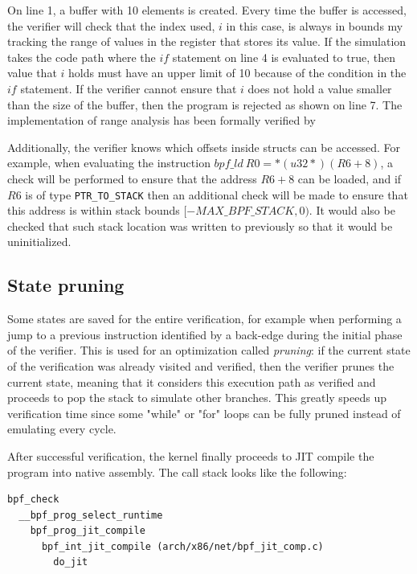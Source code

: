 On line 1, a buffer with 10 elements is created. Every time the buffer is
accessed, the verifier will check that the index used, $i$ in this case, is
always in bounds my tracking the range of values in the register that stores its
value. If the simulation takes the code path where the $if$ statement on line 4
is evaluated to true, then value that $i$ holds must have an upper limit of 10
because of the condition in the $if$ statement. If the verifier cannot ensure
that $i$ does not hold a value smaller than the size of the buffer, then the
program is rejected as shown on line 7. The implementation of range analysis has
been formally verified by \cite{vishwanathan2023verifying}

Additionally, the verifier knows which offsets inside structs can be accessed.
For example, when evaluating the instruction $bpf\_ld\ R0 = *(u32 *)(R6 + 8)$, a
check will be performed to ensure that the address $R6 + 8$ can be loaded, and
if $R6$ is of type \verb|PTR_TO_STACK| then an additional check will be made to
ensure that this address is within stack bounds $[-MAX\_BPF\_STACK, 0)$. It
would also be checked that such stack location was written to previously so that
it would be uninitialized.

\subsection{State pruning}

Some states are saved for the entire verification, for example when performing a
jump to a previous instruction identified by a back-edge during the initial
phase of the verifier. This is used for an optimization called \textit{pruning}:
if the current state of the verification was already visited and verified, then
the verifier prunes the current state, meaning that it considers this execution
path as verified and proceeds to pop the stack to simulate other branches. This
greatly speeds up verification time since some "while" or "for" loops can be
fully pruned instead of emulating every cycle.

After successful verification, the kernel finally proceeds to JIT compile the
program into native assembly. The call stack looks like the following:

\begin{verbatim}
bpf_check
  __bpf_prog_select_runtime
    bpf_prog_jit_compile
      bpf_int_jit_compile (arch/x86/net/bpf_jit_comp.c)
        do_jit
\end{verbatim}

